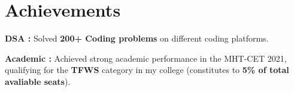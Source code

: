 \section{Achievements}
\begin{itemize} %
    \item { \textbf{DSA :} Solved \textbf{200+ Coding problems} on different coding platforms. 
        \item \textbf{ Academic :} Achieved strong academic performance in the MHT-CET 2021, qualifying for the \textbf{TFWS} category in my college (constitutes to\textbf{ \textbf{5\%} of total avaliable seats}).
    }

\end{itemize} %
